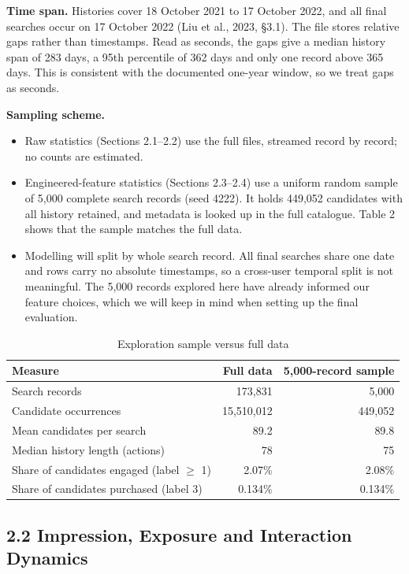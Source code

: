 \documentclass[11pt,a4paper]{article}
\newcommand{\hd}[1]{\textbf{#1}}
\newcommand{\tablestyle}{\small}
\newcommand{\headrow}{}
\begin{document}
\textbf{Time span.} Histories cover 18 October 2021 to 17 October 2022, and all final searches occur on 17 October 2022 (Liu et al., 2023, \S3.1). The file stores relative gaps rather than timestamps. Read as seconds, the gaps give a median history span of 283 days, a 95th percentile of 362 days and only one record above 365 days. This is consistent with the documented one-year window, so we treat gaps as seconds.

\textbf{Sampling scheme.}
\begin{itemize}
\item Raw statistics (Sections 2.1--2.2) use the full files, streamed record by record; no counts are estimated.
\item Engineered-feature statistics (Sections 2.3--2.4) use a uniform random sample of 5,000 complete search records (seed 4222). It holds 449,052 candidates with all history retained, and metadata is looked up in the full catalogue. Table 2 shows that the sample matches the full data.
\item Modelling will split by whole search record. All final searches share one date and rows carry no absolute timestamps, so a cross-user temporal split is not meaningful. The 5,000 records explored here have already informed our feature choices, which we will keep in mind when setting up the final evaluation.
\end{itemize}

\begin{table}[H]
\caption{Exploration sample versus full data}
\tablestyle
\centering
\begin{tabularx}{0.9\textwidth}{L R R}
\toprule
\headrow \hd{Measure} & \hd{Full data} & \hd{5,000-record sample} \\
\midrule
Search records & 173,831 & 5,000 \\
Candidate occurrences & 15,510,012 & 449,052 \\
Mean candidates per search & 89.2 & 89.8 \\
Median history length (actions) & 78 & 75 \\
Share of candidates engaged (label $\geq$ 1) & 2.07\% & 2.08\% \\
Share of candidates purchased (label 3) & 0.134\% & 0.134\% \\
\bottomrule
\end{tabularx}
\end{table}

\subsection{2.2 Impression, Exposure and Interaction Dynamics}
\end{document}
